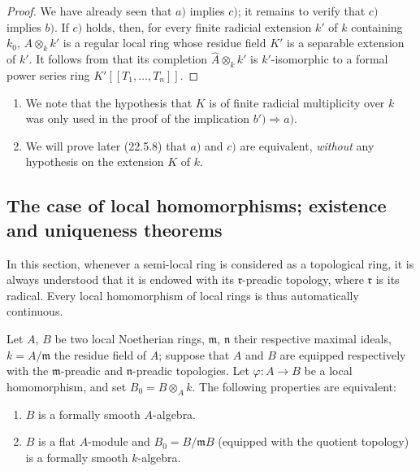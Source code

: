 \begin{proof}
We have already seen  that $a)$ implies $c)$; it remains to verify that $c)$ implies $b)$.
If $c)$ holds, then, for every finite radicial extension $k'$ of $k$ containing $k_0$, $A\otimes_k k'$ is a regular local ring whose residue field $K'$ is a separable extension of $k'$.
It follows from  that its completion
$\widehat{A}\otimes_k k'$ is $k'$-isomorphic to a formal power series ring
$K'[[T_1,\ldots,T_n]]$.
\end{proof}

\begin{remarks}[19.6.7]
\label{0.19.6.7}
\begin{enumerate}
  \item[\rm(i)] We note that the hypothesis that $K$ is of finite radicial multiplicity over $k$ was only used in the proof of the implication $b')\Rightarrow a)$.
  \item[\rm(ii)] We will prove later (22.5.8) that $a)$ and $c)$ are equivalent, \emph{without} any hypothesis on the extension $K$ of $k$.
\end{enumerate}
\end{remarks}

\subsection{The case of local homomorphisms; existence and uniqueness theorems}
\label{subsection:0.19.7}

In this section, whenever a semi-local ring is considered as a topological ring, it is always understood that it is endowed with its $\mathfrak{r}$-preadic topology, where $\mathfrak{r}$ is its radical. Every local homomorphism of local rings is thus automatically continuous.

\begin{theorem}[19.7.1]
\label{0.19.7.1}
Let $A$, $B$ be two local Noetherian rings, $\mathfrak{m}$, $\mathfrak{n}$ their respective maximal ideals, $k=A/\mathfrak{m}$ the residue field of $A$; suppose that $A$ and $B$ are equipped respectively with the $\mathfrak{m}$-preadic and $\mathfrak{n}$-preadic topologies.
Let $\varphi:A\to B$ be a local homomorphism, and set $B_0=B\otimes_A k$.
The following properties are equivalent:
\begin{enumerate}
  \item[\rm a)] $B$ is a formally smooth $A$-algebra.
  \item[\rm b)] $B$ is a flat $A$-module and $B_0=B/\mathfrak{m}B$ (equipped with the quotient topology) is a formally smooth $k$-algebra.
\end{enumerate}
\end{theorem}


